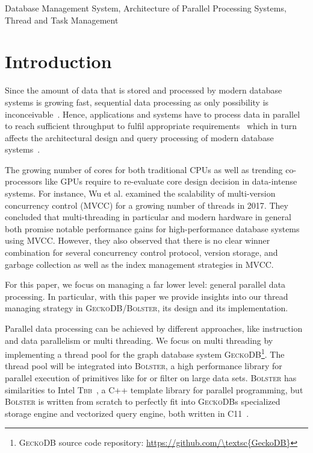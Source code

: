 \documentclass[conference]{IEEEtran}
\begin{document}
\begin{IEEEkeywords}
Database Management System, Architecture of Parallel Processing Systems, Thread and Task Management
\end{IEEEkeywords}

\section{Introduction}
Since the amount of data that is stored and processed by modern database systems is growing fast, sequential data processing as only possibility is inconceivable~\cite{Alonso:2013:HKS:2510649.2511162}. Hence, applications and systems have to process data in parallel to reach sufficient throughput to fulfil appropriate requirements~\cite{DBLP:series/synthesis/2017Ailamaki, 10.1007/978-3-319-72413-3_8, 10.5120/ijca2016912260} which in turn affects the architectural design and query processing of modern database systems~\cite{agrawal2017many, Makreshanski2017, schuh2016experimental, psaroudakis2016adaptive, psaroudakis2013task}. 

The growing number of cores for both traditional CPUs as well as trending co-processors like GPUs require to re-evaluate core design decision in data-intense systems. For instance, Wu et al. examined the scalability of multi-version concurrency control (MVCC) for a growing number of threads in 2017\cite{wu2017empirical}. They concluded that multi-threading in particular and modern hardware in general both promise notable performance gains for high-performance database systems using MVCC. However, they also observed that there is no clear winner combination for several concurrency control protocol, version storage, and garbage collection as well as the index management strategies in MVCC. 

For this paper, we focus on managing a far lower level: general parallel data processing. In particular, with this paper we provide insights into our thread managing strategy in \textsc{GeckoDB}/\textsc{Bolster}, its design and its implementation. 

Parallel data processing can be achieved by different approaches, like instruction and data parallelism or multi threading. We focus on multi threading by implementing a thread pool for the graph database system \textsc{GeckoDB}\footnote{\textsc{GeckoDB} source code repository: \url{https://github.com/\textsc{GeckoDB}}}. The thread pool will be integrated into \textsc{Bolster}, a high performance library for parallel execution of primitives like for or filter on large data sets. \textsc{Bolster} has similarities to Intel \textsc{Tbb}~\cite{books/daglib/0018624}, a \textsc{C++} template library for parallel programming, but \textsc{Bolster} is written from scratch to perfectly fit into \textsc{GeckoDB}s specialized storage engine and vectorized query engine, both written in C11~\cite{pinneckegridtables}. 
\end{document}
